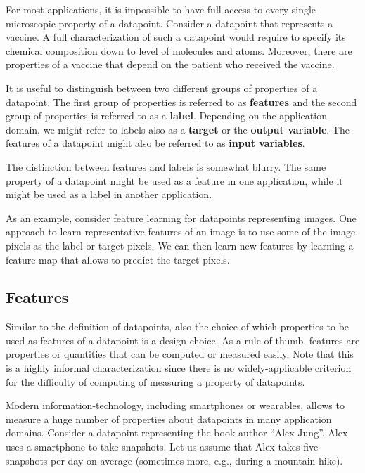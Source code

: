 \documentclass[12pt]{report}
\begin{document}
For most applications, it is impossible to have full access to 
every single microscopic property of a datapoint. Consider a 
datapoint that represents a vaccine. A full characterization of 
such a datapoint would require to specify its chemical composition 
down to level of molecules and atoms. Moreover, there are 
properties of a vaccine that depend on the patient who 
received the vaccine. 

It is useful to distinguish between two different groups of 
properties of a datapoint. The first group of properties is 
referred to as {\bf features}  and the second group of properties 
is referred to as a {\bf label}. Depending on the application domain, 
we might refer to labels also as a {\bf target} or the {\bf output variable}. 
The features of a datapoint might also be referred to as {\bf input variables}. 

The distinction between features and labels is somewhat 
blurry. The same property of a datapoint might be used 
as a feature in one application, while it might be used as 
a label in another application. 

As an example, consider feature learning for datapoints 
representing images. One approach to learn representative 
features of an image is to use some of the image pixels as 
the label or target pixels. We can then learn new features 
by learning  a feature map that allows to predict the target 
pixels. 

\subsection{Features}
\label{sec_feature_space}

Similar to the definition of datapoints, also the choice of which 
properties to be used as features of a datapoint is a design choice. 
As a rule of thumb, features are properties or quantities that can be 
computed or measured easily. Note that this is a highly informal characterization 
since there is no widely-applicable criterion for the difficulty of computing 
of measuring a property of datapoints.  

Modern information-technology, including smartphones or wearables, 
allows to measure a huge number of properties about datapoints in 
many application domains. Consider a datapoint representing the book 
author ``Alex Jung''. Alex uses a smartphone to take snapshots. 
Let us assume that Alex takes five snapshots per day on average (sometimes 
more, e.g., during a mountain hike). 
\end{document}
